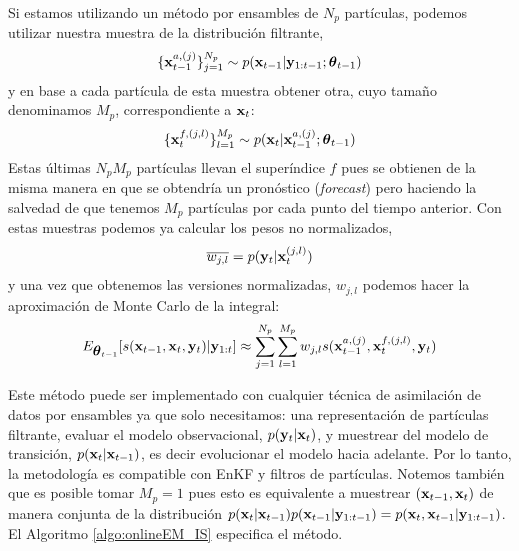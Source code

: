 Si estamos utilizando un método por ensambles de $N_p$ partículas, podemos utilizar nuestra muestra de la distribución filtrante,
\begin{align*}
    \{ \mathbf{x}_{t-1}^{a, (j)}\}_{j=1}^{N_p} \sim p(\mathbf{x}_{t-1} | \mathbf{y}_{1:t-1} ; \mbox{\boldmath$ \theta $}_{t-1})
\end{align*}
y en base a cada partícula de esta muestra obtener otra, cuyo tamaño denominamos $M_p$, correspondiente a $\mathbf{x}_t$:
\begin{align*}
    \{ \mathbf{x}_{t}^{f, (j,l)}\}_{l=1}^{M_p} \sim p(\mathbf{x}_t | \mathbf{x}_{t-1}^{a, (j)} ; \mbox{\boldmath$ \theta $}_{t-1})
\end{align*}
Estas últimas $N_p M_p$ partículas llevan el superíndice $f$ pues se obtienen de la misma manera en que se obtendría un pronóstico (\textit{forecast}) pero haciendo la salvedad de que tenemos $M_p$ partículas por cada punto del tiempo anterior. Con estas muestras podemos ya calcular los pesos no normalizados,
\begin{align*}
    \overline{w_{j,l}} = p(\mathbf{y}_t | \mathbf{x}_t^{(j,l)})
\end{align*}
y una vez que obtenemos las versiones normalizadas, $w_{j,l}$ podemos hacer la aproximación de Monte Carlo de la integral:
\begin{align*}
    E_{\mbox{\boldmath$ \theta $}_{t-1}} [s(\mathbf{x}_{t-1}, \mathbf{x}_t, \mathbf{y}_t) | \mathbf{y}_{1:t}] \approx \sum_{j=1}^{N_p} \sum_{l=1}^{M_p} w_{j, l} s(\mathbf{x}_{t-1}^{a, (j)}, \mathbf{x}_{t}^{f, (j,l)}, \mathbf{y}_t)
\end{align*}

Este método puede ser implementado con cualquier técnica de asimilación de datos por ensambles ya que solo necesitamos: una representación de partículas filtrante, evaluar el modelo observacional, $p(\mathbf{y}_t | \mathbf{x}_t)$, y muestrear del modelo de transición, $p(\mathbf{x}_t | \mathbf{x}_{t-1})$, es decir evolucionar el modelo hacia adelante. Por lo tanto, la metodología es compatible con EnKF y filtros de partículas. Notemos también que es posible tomar $M_p = 1$ pues esto es equivalente a muestrear $(\mathbf{x}_{t-1}, \mathbf{x}_t)$ de manera conjunta de la distribución $p(\mathbf{x}_t | \mathbf{x}_{t-1}) p(\mathbf{x}_{t-1} | \mathbf{y}_{1:t-1}) = p(\mathbf{x}_t, \mathbf{x}_{t-1} | \mathbf{y}_{1:t-1})$. El Algoritmo \ref{algo:onlineEM_IS} especifica el método.

